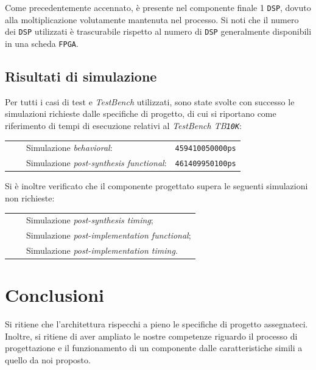 \documentclass{article}
\newcommand{\tabitem}{~~\llap{\textbullet}~~}
\begin{document}
Come precedentemente accennato, è presente nel componente finale 1 \texttt{DSP}, dovuto alla moltiplicazione volutamente mantenuta nel processo. Si noti che il numero dei \texttt{DSP} utilizzati è trascurabile rispetto al numero di \texttt{DSP} generalmente disponibili in una scheda \texttt{FPGA}.
\vspace{0,2cm}

\subsection{Risultati di simulazione}
Per tutti i casi di test e \emph{TestBench} utilizzati, sono state svolte con successo le simulazioni richieste dalle specifiche di progetto, di cui si riportano come riferimento di tempi di esecuzione relativi al \emph{TestBench TB\texttt{10K}}:\par
\def\arraystretch{1.3} %
\begin{tabular}{m{8cm} m{3cm}}
    \tabitem Simulazione \emph{behavioral}:                & \texttt{459410050000ps} \\
    \tabitem Simulazione \emph{post-synthesis functional}: & \texttt{461409950100ps} \\
\end{tabular}\vspace{0,2cm}

Si è inoltre verificato che il componente progettato supera le seguenti simulazioni non richieste:\par
\def\arraystretch{1.3} %
\begin{tabular}{m{8cm}}
    \tabitem Simulazione \emph{post-synthesis timing};          \\
    \tabitem Simulazione \emph{post-implementation functional}; \\
    \tabitem Simulazione \emph{post-implementation timing}.     \\
\end{tabular}\vspace{1cm}

\section{Conclusioni}
Si ritiene che l’architettura rispecchi a pieno le specifiche di progetto assegnateci. Inoltre, si ritiene di aver ampliato le nostre competenze riguardo il processo di progettazione e il funzionamento di un componente dalle caratteristiche simili a quello da noi proposto.
\end{document}
